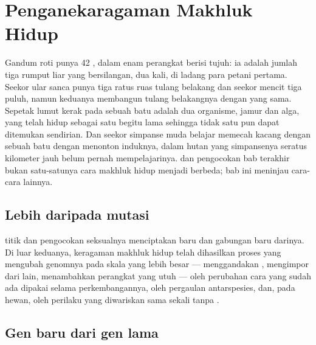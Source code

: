 \chapter{Penganekaragaman Makhluk Hidup}\label{ch:g12:diversification-of-life}

Gandum roti punya 42 , dalam enam perangkat berisi tujuh: ia
adalah jumlah tiga rumput liar yang bersilangan, dua kali, di ladang
para petani pertama. Seekor ular sanca punya tiga ratus ruas tulang
belakang dan seekor mencit tiga puluh, namun keduanya membangun tulang
belakangnya dengan  yang sama. Sepetak lumut kerak pada sebuah batu
adalah dua organisme, jamur dan alga, yang telah hidup sebagai satu
begitu lama sehingga tidak satu pun dapat ditemukan sendirian. Dan
seekor simpanse muda belajar memecah kacang dengan sebuah batu dengan
menonton induknya, dalam hutan yang simpansenya seratus kilometer jauh
belum pernah mempelajarinya.  dan pengocokan bab terakhir bukan
satu-satunya cara makhluk hidup menjadi berbeda; bab ini meninjau
cara-cara lainnya.

\section{Lebih daripada mutasi}

\begin{proposition}\label{prop:g12:diversification-of-life:sources}
 titik dan pengocokan seksualnya menciptakan  baru dan
gabungan baru darinya. Di luar keduanya, keragaman makhluk hidup telah
dihasilkan proses yang mengubah genomnya pada skala yang lebih besar
--- menggandakan , mengimpor  dari  lain, menambahkan
perangkat  yang utuh --- oleh perubahan cara  yang sudah ada
dipakai selama perkembangannya, oleh pergaulan antarspesies, dan, pada
hewan, oleh perilaku yang diwariskan sama sekali tanpa .
\end{proposition}
\admitted

\section{Gen baru dari gen lama}

